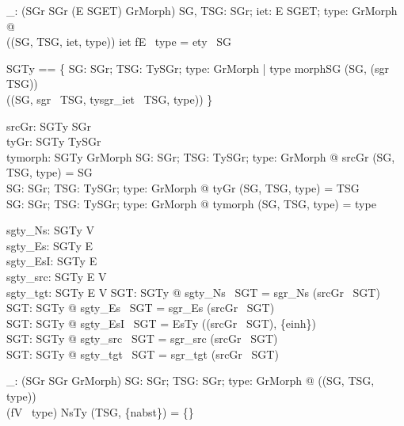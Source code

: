 \begin{axdef}
  \instanceEdgesOk\_: \power  (SGr \cross  SGr \cross  (E \pfun  SGET) \cross  GrMorph)
\where
  \forall  SG, TSG: SGr; iet: E \pfun  SGET; type: GrMorph @ \\ \quad 
  (\instanceEdgesOk (SG, TSG, iet, type)) \iff  iet \circ  fE~ type = ety~ SG
\end{axdef}

\begin{zed}
SGTy == \{  SG: SGr; TSG: TySGr; type: GrMorph | type \in  morphSG (SG, (sgr~ TSG)) \land  \\ \quad 
(\instanceEdgesOk (SG, sgr~ TSG, tysgr\_iet~ TSG, type)) \}
\end{zed}

\begin{axdef}
  srcGr: SGTy \fun  SGr\\
  tyGr: SGTy \fun  TySGr\\
  tymorph: SGTy \fun  GrMorph
\where
  \forall  SG: SGr; TSG: TySGr; type: GrMorph @ srcGr (SG, TSG, type) = SG\\
  \forall  SG: SGr; TSG: TySGr; type: GrMorph @ tyGr (SG, TSG, type) = TSG\\
  \forall  SG: SGr; TSG: TySGr; type: GrMorph @ tymorph (SG, TSG, type) = type
\end{axdef}

\begin{axdef}
  sgty\_Ns: SGTy \fun  \power  V\\
  sgty\_Es: SGTy \fun  \power  E\\
  sgty\_EsI: SGTy \fun  \power  E\\
  sgty\_src: SGTy \fun  E \pfun  V\\
  sgty\_tgt: SGTy \fun  E \pfun  V
\where
  \forall  SGT: SGTy @ sgty\_Ns~ SGT = sgr\_Ns (srcGr~ SGT)\\
  \forall  SGT: SGTy @ sgty\_Es~ SGT = sgr\_Es (srcGr~ SGT)\\
  \forall  SGT: SGTy @ sgty\_EsI~ SGT = EsTy ((srcGr~ SGT), \{einh\})\\
  \forall  SGT: SGTy @ sgty\_src~ SGT = sgr\_src (srcGr~ SGT)\\
  \forall  SGT: SGTy @ sgty\_tgt~ SGT = sgr\_tgt (srcGr~ SGT)
\end{axdef}

\begin{axdef}
  \abstractNoDirectInstances\_: \power  (SGr \cross  SGr \cross  GrMorph)
\where
  \forall  SG: SGr; TSG: SGr; type: GrMorph @ (\abstractNoDirectInstances (SG, TSG, type)) \iff \\ \quad
   (fV~ type) \inv  \limg  NsTy (TSG, \{nabst\}) \rimg  = \{\}
\end{axdef}

